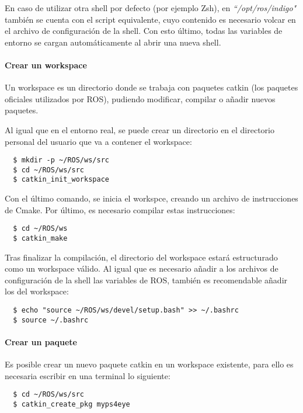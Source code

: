 En caso de utilizar otra shell por defecto (por ejemplo Zsh), en
\textit{``/opt/ros/indigo"} también se cuenta con el script equivalente, cuyo
contenido es necesario volcar en el archivo de configuración de la shell. Con
esto último, todas las variables de entorno se cargan automáticamente al abrir
una nueva shell.

\paragraph{Crear un workspace} \hspace{0pt}

Un workspace es un directorio donde se trabaja con paquetes catkin (los paquetes
oficiales utilizados por ROS), pudiendo modificar, compilar o añadir nuevos
paquetes.

Al igual que en el entorno real, se puede crear un directorio en el directorio
personal del usuario que va a contener el workspace:
\\
\begin{lstlisting}
  $ mkdir -p ~/ROS/ws/src
  $ cd ~/ROS/ws/src
  $ catkin_init_workspace
\end{lstlisting}

Con el último comando, se inicia el workspce, creando un archivo de
instrucciones de Cmake. Por último, es necesario compilar estas instrucciones:
\\
\begin{lstlisting}
  $ cd ~/ROS/ws
  $ catkin_make
\end{lstlisting}

Tras finalizar la compilación, el directorio del workspace estará estructurado
como un workspace válido. Al igual que es necesario añadir a los archivos de
configuración de la shell las variables de ROS, también es recomendable añadir
los del workspace:
\\
\begin{lstlisting}
  $ echo "source ~/ROS/ws/devel/setup.bash" >> ~/.bashrc
  $ source ~/.bashrc
\end{lstlisting}

\paragraph{Crear un paquete} \hspace{0pt}

Es posible crear un nuevo paquete catkin en un workspace existente, para ello es
necesaria escribir en una terminal lo siguiente:
\\
\begin{lstlisting}
  $ cd ~/ROS/ws/src
  $ catkin_create_pkg myps4eye
\end{lstlisting}

